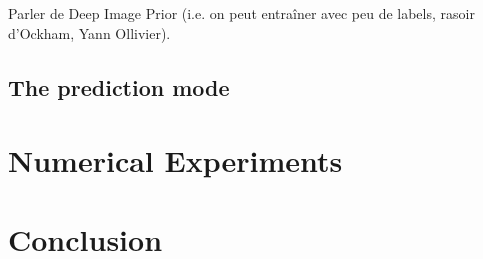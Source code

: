 \documentclass{article}
\begin{document}
Parler de Deep Image Prior (i.e. on peut entraîner avec peu de labels, rasoir d'Ockham, Yann Ollivier).

\subsection{The prediction mode}


\section{Numerical Experiments}
\label{sec:experiments}




\section{Conclusion}
\label{sec:conclusion}




\vfill
\pagebreak




\end{document}
